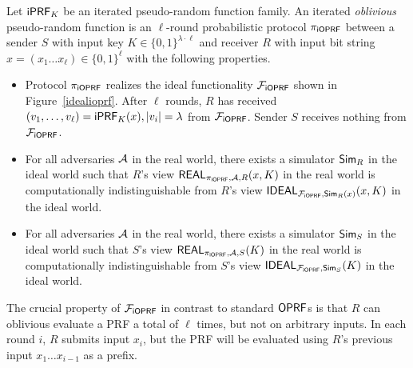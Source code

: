 \begin{definition}[$\proto$]
  Let $\mathsf{i}\mathsf{PRF}_K$ be an iterated pseudo-random function family.  An
  iterated \emph{oblivious} pseudo-random function is an $\ell$-round
  probabilistic protocol $\proto$ between a sender $S$ with input key
  $K\in\{0,1\}^{\lambda\cdot\ell}$ and receiver $R$ with input bit
  string $x=(x_1\ldots{}x_\ell)\in\{0,1\}^{\ell}$ with the following
  properties.

  \begin{itemize}
   
  \item Protocol $\proto$ realizes the ideal functionality $\mathcal{F}_{\mathsf{i}\mathsf{OPRF}}$
    shown in Figure~\ref{idealioprf}. After $\ell$ rounds, $R$ has
    received $(v_1,\ldots,v_\ell)=\mathsf{i}\mathsf{PRF}_K(x),|v_i|=\lambda$ from
    $\mathcal{F}_{\mathsf{i}\mathsf{OPRF}}$. Sender $S$ receives nothing from $\mathcal{F}_{\mathsf{i}\mathsf{OPRF}}$.
  
  \item For all adversaries ${\mathcal{A}}$ in the real world, there exists a
    simulator ${\mathsf{Sim}}_R$ in the ideal world such that $R$'s view
    $\mathsf{REAL}_{{\pi_{\mathsf{i}\mathsf{OPRF}}},{\mathcal{A}},R}(x,K)$ in the real world is
    computationally indistinguishable from $R$'s view
    $\mathsf{IDEAL}_{\mathcal{F}_{\mathsf{i}\mathsf{OPRF}},{\mathsf{Sim}}_R(x)}(x,K)$ in the ideal world.

  \item For all adversaries ${\mathcal{A}}$ in the real world, there exists a
    simulator ${\mathsf{Sim}}_S$ in the ideal world such that $S$'s view
    $\mathsf{REAL}_{{\pi_{\mathsf{i}\mathsf{OPRF}}},{\mathcal{A}},S}(K)$ in the real world is
    computationally indistinguishable from $S$'s view
    $\mathsf{IDEAL}_{\mathcal{F}_{\mathsf{i}\mathsf{OPRF}},{\mathsf{Sim}}_S}(K)$ in the ideal world.
\end{itemize}
\end{definition}

The crucial property of $\mathcal{F}_{\mathsf{i}\mathsf{OPRF}}$ in contrast to standard $\mathsf{OPRF}$s is
that $R$ can oblivious evaluate a PRF a total of $\ell$ times, but not
on arbitrary inputs. In each round $i$, $R$ submits input $x_i$, but
the PRF will be evaluated using $R$'s previous input
$x_1\ldots{}x_{i-1}$ as a prefix.

